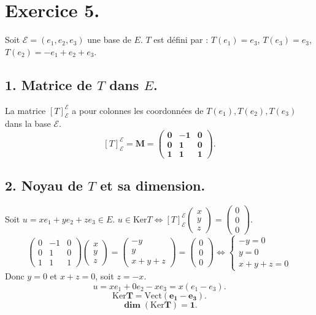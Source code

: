 \documentclass[french]{yLectureNote}
\begin{document}
\section*{Exercice 5.}
Soit $\mathcal{E}=(e_{1},e_{2},e_{3})$ une base de $E$. $T$ est défini par : $T(e_{1})=e_{3}$, $T(e_{3})=e_{3}$, $T(e_{2})=-e_{1}+e_{2}+e_{3}$.

\subsection*{1. Matrice de $T$ dans $E$.}
La matrice $[T]_{\mathcal{E}}^{\mathcal{E}}$ a pour colonnes les coordonnées de $T(e_1), T(e_2), T(e_3)$ dans la base $\mathcal{E}$.
$$[T]_{\mathcal{E}}^{\mathcal{E}} = \mathbf{M = \begin{pmatrix} 0 & -1 & 0 \\ 0 & 1 & 0 \\ 1 & 1 & 1 \end{pmatrix}.}$$

\subsection*{2. Noyau de $T$ et sa dimension.}
Soit $u = x e_1 + y e_2 + z e_3 \in E$. $u \in \mathrm{Ker}T \iff [T]_{\mathcal{E}}^{\mathcal{E}} \begin{pmatrix} x \\ y \\ z \end{pmatrix} = \begin{pmatrix} 0 \\ 0 \\ 0 \end{pmatrix}$.
$$\begin{pmatrix} 0 & -1 & 0 \\ 0 & 1 & 0 \\ 1 & 1 & 1 \end{pmatrix} \begin{pmatrix} x \\ y \\ z \end{pmatrix} = \begin{pmatrix} -y \\ y \\ x+y+z \end{pmatrix} = \begin{pmatrix} 0 \\ 0 \\ 0 \end{pmatrix} \iff \begin{cases} -y = 0 \\ y = 0 \\ x+y+z = 0 \end{cases}$$
Donc $y=0$ et $x+z=0$, soit $z=-x$.
$$u = x e_1 + 0 e_2 - x e_3 = x(e_1 - e_3).$$
$$\mathbf{\mathrm{Ker}T = \mathrm{Vect}(e_1 - e_3)}.$$
$$\mathbf{\dim(\mathrm{Ker}T) = 1}.$$
\end{document}
